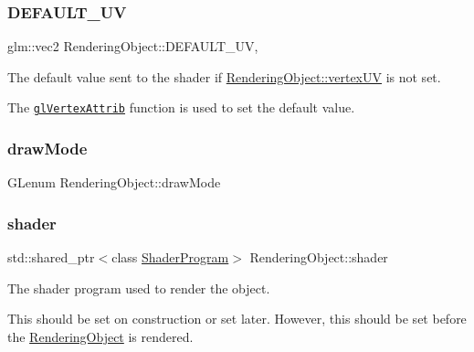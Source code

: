 \subsubsection{\texorpdfstring{D\+E\+F\+A\+U\+L\+T\+\_\+\+UV}{DEFAULT\_UV}}
{\footnotesize\ttfamily glm\+::vec2 Rendering\+Object\+::\+D\+E\+F\+A\+U\+L\+T\+\_\+\+UV\hspace{0.3cm}{\ttfamily [static]}, {\ttfamily [protected]}}



The default value sent to the shader if \hyperlink{class_rendering_object_afc405316bddec4ba1d5c228ecc0d9061}{Rendering\+Object\+::vertex\+UV} is not set.

The \href{https://www.opengl.org/sdk/docs/man/html/glVertexAttrib.xhtml}{\tt gl\+Vertex\+Attrib} function is used to set the default value. \hypertarget{class_rendering_object_aa67856a72705b54a5667e91e270d00b3}{}\label{class_rendering_object_aa67856a72705b54a5667e91e270d00b3}
\subsubsection{\texorpdfstring{draw\+Mode}{drawMode}}
{\footnotesize\ttfamily G\+Lenum Rendering\+Object\+::draw\+Mode\hspace{0.3cm}{\ttfamily [protected]}}

\hypertarget{class_rendering_object_ae50e545ce2008ffa802478cd4316e82e}{}\label{class_rendering_object_ae50e545ce2008ffa802478cd4316e82e}
\subsubsection{\texorpdfstring{shader}{shader}}
{\footnotesize\ttfamily std\+::shared\+\_\+ptr$<$class \hyperlink{class_shader_program}{Shader\+Program}$>$ Rendering\+Object\+::shader\hspace{0.3cm}{\ttfamily [protected]}}



The shader program used to render the object.

This should be set on construction or set later. However, this should be set before the \hyperlink{class_rendering_object}{Rendering\+Object} is rendered. \hypertarget{class_rendering_object_a96dd05670a977a949514a2c490c1c867}{}\label{class_rendering_object_a96dd05670a977a949514a2c490c1c867}
